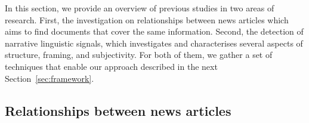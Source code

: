 \label{sec:related}

In this section, we provide an overview of previous studies in two areas of research. First, the investigation on relationships between news articles which aims to find documents that cover the same information. Second, the detection of narrative linguistic signals, which investigates and characterises several aspects of structure, framing, and subjectivity.
For both of them, we gather a set of techniques that enable our approach described in the next Section~\ref{sec:framework}.


\begin{comment}
    But there are different limitations of what is available.
    For example, the approach proposed by~\cite{bountouridis2018explaining} finds and links similar articles and similar sentences (POI) in them, but mainly focuses on finding indications of corroborated information or omitted information.
    Their work does not investigate the differences between the linked pieces, accounting for subtle modifications and their exploitation to provide bias / subjectivity (framing / word choices).
    Another recent work~\cite{zahid2019towards} instead is just focusing on a single article narrative analysis, without linking and comparing it to other news articles.
    \todo[color=yellow]{move this paragraph to related work, just leave a sentence here}
\end{comment}

\subsection{Relationships between news articles}


